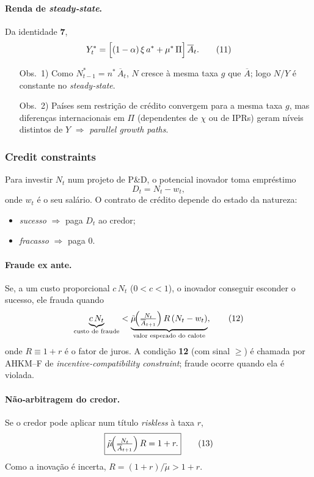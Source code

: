 \documentclass[a4paper,12pt]{article}[abntex2]
\begin{document}
\paragraph{Renda de \emph{steady‐state}.}
Da identidade \textbf{7},
\[
    Y_t^{\ast}
      = \Bigl[(1-\alpha)\,\xi\,a^{\ast}
              +\mu^{\ast}\,\Pi\Bigr]\,
        \overline{A}_t.
    \tag{11}
\]
\begin{itemize}
    \item[Obs.~1)] Como $N_{t-1}^{\ast}=n^{\ast}\,\overline{A}_t$, $N$ cresce à mesma taxa $g$ que $\overline{A}$; logo $N/Y$ é constante no \emph{steady‐state}.
    \item[Obs.~2)] Países sem restrição de crédito convergem para a mesma taxa $g$, mas diferenças internacionais em $\Pi$ (dependentes de $\chi$ ou de IPRs) geram níveis distintos de $Y$ $\Rightarrow$ \textit{parallel growth paths}.
\end{itemize}

\subsubsection{\textbf{Credit constraints}}

Para investir $N_t$ num projeto de P\&D, o potencial inovador toma empréstimo
\[
    D_t = N_t - w_t,
\]
onde $w_t$ é o seu salário.  
O contrato de crédito depende do estado da natureza:  

\begin{itemize}
    \item \textit{sucesso} $\Rightarrow$ paga $D_t$ ao credor;
    \item \textit{fracasso} $\Rightarrow$ paga $0$.
\end{itemize}

\paragraph{Fraude ex ante.}
Se, a um custo proporcional $c\,N_t$ ($0<c<1$), o inovador conseguir esconder o sucesso, ele frauda quando
\[
    \underbrace{c\,N_t}_{\text{custo de fraude}}
      < \underbrace{\tilde{\mu}\!\Bigl(\tfrac{N_t}{\overline{A}_{t+1}}\Bigr)\,
                    R\,(N_t-w_t)}_{\text{valor esperado do calote}},
    \tag{12}
\]
onde $R\equiv1+r$ é o fator de juros.  
A condição \textbf{12} (com sinal $\ge$) é chamada por AHKM–F de \emph{incentive-compatibility constraint}; fraude ocorre quando ela é violada.

\paragraph{Não‐arbitragem do credor.}
Se o credor pode aplicar num título \emph{riskless} à taxa $r$,
\[
    \boxed{\tilde{\mu}\!\Bigl(\tfrac{N_t}{\overline{A}_{t+1}}\Bigr)\,R = 1+r.}
    \tag{13}
\]
Como a inovação é incerta, $R=(1+r)/\tilde{\mu}>1+r$.
\end{document}
